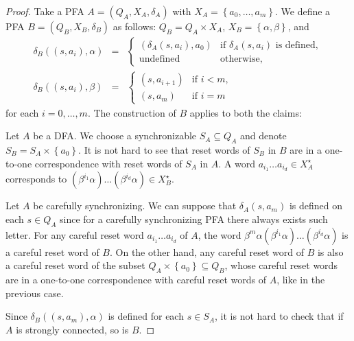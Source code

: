 \documentclass{ws-ijmpc}
\DeclareMathOperator{\und}{\mbox{undefined}}
\begin{document}
\begin{proof}
Take a PFA $A=\left(Q_{A},X_{A},\delta_{A}\right)$ with $X_{A}=\left\{ a_{0},\dots,a_{m}\right\} $.
We define a PFA $B=\left(Q_{B},X_{B},\delta_{B}\right)$ as follows:
$Q_{B}=Q_{A}\times X_{A}$, $X_{B}=\left\{ \alpha,\beta\right\} $,
and
\begin{eqnarray*}
\delta_{B}\!\left(\left(s,a_{i}\right),\alpha\right) & = & \begin{cases}
\left(\delta_{A}\!\left(s,a_{i}\right),a_{0}\right) & \mbox{if }\delta_{A}\!\left(s,a_{i}\right)\mbox{ is defined},\\
\und & \mbox{otherwise},
\end{cases}\\
\delta_{B}\!\left(\left(s,a_{i}\right),\beta\right) & = & \begin{cases}
\left(s,a_{i+1}\right) & \mbox{if }i<m,\\
\left(s,a_{m}\right) & \mbox{if }i=m
\end{cases}
\end{eqnarray*}
for each $i=0,\dots,m$. The construction of $B$ applies to both
the claims:
\begin{romanlist}
\item Let $A$ be a DFA. We choose a synchronizable $S_{A}\subseteq Q_{A}$
and denote $S_{B}=S_{A}\times\left\{ a_{0}\right\} $. It is not hard
to see that reset words of $S_{B}$ in $B$ are in a one-to-one correspondence
with reset words of $S_{A}$ in $A$. A word $a_{i_{1}}\dots a_{i_{d}}\in X_{A}^{\star}$
corresponds to $\left(\beta^{i_{1}}\alpha\right)\dots\left(\beta^{i_{d}}\alpha\right)\in X_{B}^{\star}$. 
\item Let $A$ be carefully synchronizing. We can suppose that $\delta_{A}\!\left(s,a_{m}\right)$
is defined on each $s\in Q_{A}$ since for a carefully synchronizing
PFA there always exists such letter. For any careful reset word $a_{i_{1}}\dots a_{i_{d}}$
of $A$, the word $\beta^{m}\alpha\left(\beta^{i_{1}}\alpha\right)\dots\left(\beta^{i_{d}}\alpha\right)$
is a careful reset word of $B$. On the other hand, any careful reset
word of $B$ is also a careful reset word of the subset $Q_{A}\times\left\{ a_{0}\right\} \subseteq Q_{B}$,
whose careful reset words are in a one-to-one correspondence with
careful reset words of $A$, like in the previous case.
\end{romanlist}
Since $\delta_{B}\!\left(\left(s,a_{m}\right),\alpha\right)$ is defined
for each $s\in S_{A}$, it is not hard to check that if $A$ is strongly
connected, so is $B$.
\end{proof}
\end{document}
